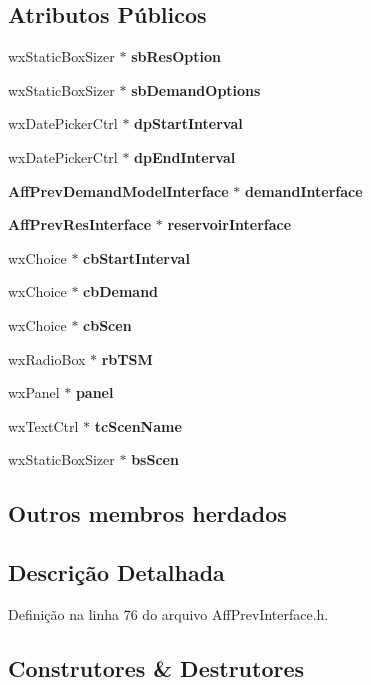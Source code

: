 \subsection*{Atributos Públicos}
\begin{DoxyCompactItemize}
\item 
wx\+Static\+Box\+Sizer $\ast$ {\bf sb\+Res\+Option}
\item 
wx\+Static\+Box\+Sizer $\ast$ {\bf sb\+Demand\+Options}
\item 
wx\+Date\+Picker\+Ctrl $\ast$ {\bf dp\+Start\+Interval}
\item 
wx\+Date\+Picker\+Ctrl $\ast$ {\bf dp\+End\+Interval}
\item 
{\bf Aff\+Prev\+Demand\+Model\+Interface} $\ast$ {\bf demand\+Interface}
\item 
{\bf Aff\+Prev\+Res\+Interface} $\ast$ {\bf reservoir\+Interface}
\item 
wx\+Choice $\ast$ {\bf cb\+Start\+Interval}
\item 
wx\+Choice $\ast$ {\bf cb\+Demand}
\item 
wx\+Choice $\ast$ {\bf cb\+Scen}
\item 
wx\+Radio\+Box $\ast$ {\bf rb\+T\+SM}
\item 
wx\+Panel $\ast$ {\bf panel}
\item 
wx\+Text\+Ctrl $\ast$ {\bf tc\+Scen\+Name}
\item 
wx\+Static\+Box\+Sizer $\ast$ {\bf bs\+Scen}
\end{DoxyCompactItemize}
\subsection*{Outros membros herdados}


\subsection{Descrição Detalhada}


Definição na linha 76 do arquivo Aff\+Prev\+Interface.\+h.



\subsection{Construtores \& Destrutores}
